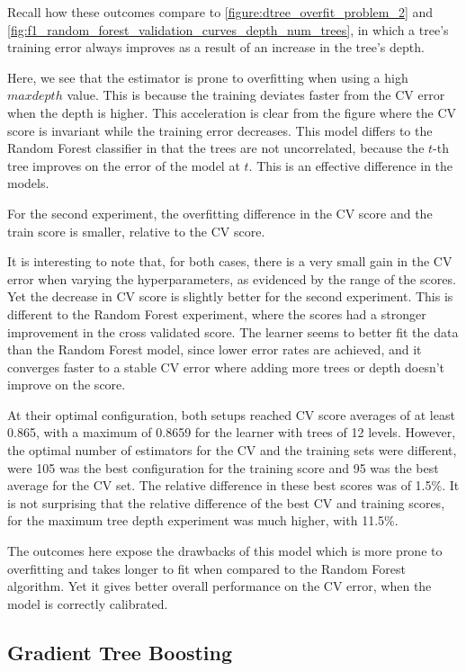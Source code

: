 Recall how these outcomes compare to \cref{figure:dtree_overfit_problem_2} and \cref{fig:f1_random_forest_validation_curves_depth_num_trees},
in which a tree's training error always improves as a result of an increase in the tree's depth.

Here, we see that the estimator is prone to overfitting when using a high $max depth$ value.
This is because the training deviates faster from the CV error when the depth is higher.
This acceleration is clear from the figure where the CV score is invariant while the training error decreases.
This model differs to the Random Forest classifier in that the trees are not uncorrelated, because the $t$-th tree improves on the error of the model at $t$.
This is an effective difference in the models.

For the second experiment, the overfitting difference in the CV score and the train score is smaller, relative to the CV score.

It is interesting to note that, for both cases, there is a very small gain in the CV error when varying the hyperparameters, as evidenced by the range of the scores.
Yet the decrease in CV score is slightly better for the second experiment.
This is different to the Random Forest experiment, where the scores had a stronger improvement in the cross validated score.
The learner seems to better fit the data than the Random Forest model, since lower error rates are achieved, and it converges faster to a stable CV error where adding more trees or depth doesn't improve on the score.

At their optimal configuration, both setups reached CV score averages of at least 0.865, with a maximum of 0.8659 for the learner with trees of 12 levels.
However, the optimal number of estimators for the CV and the training sets were different, were 105 was the best configuration for the training score and 95 was the best average for the CV set. The relative difference in these best scores was of 1.5\%.
It is not surprising that the relative difference of the best CV and training scores, for the maximum tree depth experiment was much higher, with 11.5\%.

The outcomes here expose the drawbacks of this model which is more prone to overfitting and takes longer to fit when compared to the Random Forest algorithm.
Yet it gives better overall performance on the CV error, when the model is correctly calibrated.



\subsection{Gradient Tree Boosting}

